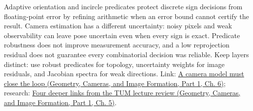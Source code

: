 Adaptive orientation and incircle predicates protect discrete sign decisions from floating-point error by refining arithmetic when an error bound cannot certify the result. Camera estimation has a different uncertainty: noisy pixels and weak observability can leave pose uncertain even when every sign is exact. Predicate robustness does not improve measurement accuracy, and a low reprojection residual does not guarantee every combinatorial decision was reliable. Keep layers distinct: use robust predicates for topology, uncertainty weights for image residuals, and Jacobian spectra for weak directions. Link: \href{../03-Geometry-Cameras-and-Image-Formation-P01/main.pdf\#nameddest=02-foundations-ii-ch037-a-camera-model-must-close-the-loop}{A camera model must close the loop (Geometry, Cameras, and Image Formation, Part 1, Ch. 6)}; research: \href{../03-Geometry-Cameras-and-Image-Formation-P01/main.pdf\#nameddest=02-foundations-ii-ch036-four-deeper-links-from-the-tum-lecture-review}{Four deeper links from the TUM lecture review (Geometry, Cameras, and Image Formation, Part 1, Ch. 5)}.
